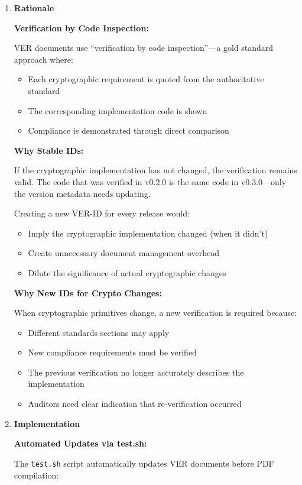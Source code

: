 \documentclass[11pt,letterpaper]{article}
\newcommand{\dmsection}[1]{\item \textbf{#1}\par}
\begin{document}
\begin{enumerate}
\dmsection{Rationale}

\textbf{Verification by Code Inspection:}

VER documents use ``verification by code inspection''---a gold standard approach where:
\begin{itemize}
    \item Each cryptographic requirement is quoted from the authoritative standard
    \item The corresponding implementation code is shown
    \item Compliance is demonstrated through direct comparison
\end{itemize}

\textbf{Why Stable IDs:}

If the cryptographic implementation has not changed, the verification remains valid. The code that was verified in v0.2.0 is the same code in v0.3.0---only the version metadata needs updating.

Creating a new VER-ID for every release would:
\begin{itemize}
    \item Imply the cryptographic implementation changed (when it didn't)
    \item Create unnecessary document management overhead
    \item Dilute the significance of actual cryptographic changes
\end{itemize}

\textbf{Why New IDs for Crypto Changes:}

When cryptographic primitives change, a new verification is required because:
\begin{itemize}
    \item Different standards sections may apply
    \item New compliance requirements must be verified
    \item The previous verification no longer accurately describes the implementation
    \item Auditors need clear indication that re-verification occurred
\end{itemize}

\dmsection{Implementation}

\textbf{Automated Updates via test.sh:}

The \texttt{test.sh} script automatically updates VER documents before PDF compilation:


\end{enumerate}
\end{document}
